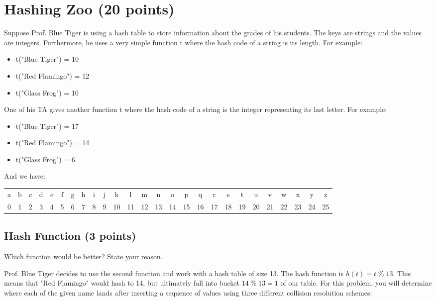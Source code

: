 \documentclass[11pt]{exam}
\begin{document}
\section{Hashing Zoo (20 points)}
Suppose Prof. Blue Tiger is using a hash table to store information about the grades of his students. The keys are strings and the values are integers. Furthermore, he uses a very simple function t where the hash code of a string is its length. For example:
\begin{itemize}
    \item t("Blue Tiger") = 10
    \item t("Red Flamingo") = 12
    \item t("Glass Frog") = 10
\end{itemize}
One of his TA gives another function t where the hash code of a string is the integer representing its last letter.
For example:
\begin{itemize}
    \item t("Blue Tiger") = 17
    \item t("Red Flamingo") = 14
    \item t("Glass Frog") = 6
\end{itemize}
And we have:
\begin{table}[H]
    \centering
    \setlength{\tabcolsep}{1mm}
    \begin{tabular}{cccccccccccccccccccccccccc}
        a & b & c & d & e & f & g & h & i & j & k  & l  & m  & n  & o  & p  & q  & r  & s  & t  & u  & v  & w  & x  & y  & z  \\
        0 & 1 & 2 & 3 & 4 & 5 & 6 & 7 & 8 & 9 & 10 & 11 & 12 & 13 & 14 & 15 & 16 & 17 & 18 & 19 & 20 & 21 & 22 & 23 & 24 & 25
    \end{tabular}
\end{table}

\subsection{Hash Function (3 points)}
Which function would be better? State your reason.

\begin{solution}
\end{solution}

Prof. Blue Tiger decides to use the second function and work with a hash table of size 13. The hash function is $h(t) = t \;\%\; 13$. This means that "Red Flamingo" would hash to 14, but ultimately fall into bucket $14 \;\%\; 13 = 1$ of our table. For this problem, you will determine where each of the given name lands after inserting a sequence of values using three different collision resolution schemes:
\end{document}
